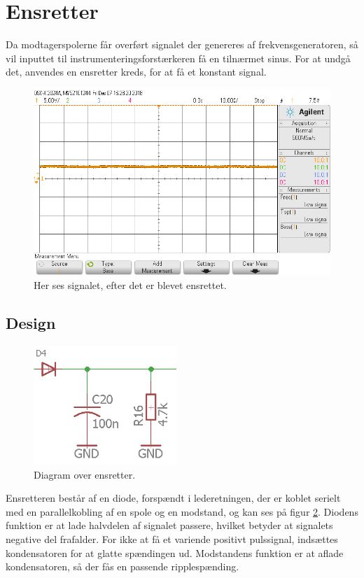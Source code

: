 \section{Ensretter}\label{sec:ensretter}
Da modtagerspolerne får overført signalet der genereres af frekvensgeneratoren, så vil inputtet til instrumenteringsforstærkeren få en tilnærmet sinus.
For at undgå det, anvendes en ensretter kreds, for at få et konstant signal.
\begin{figure}[h!]
	\centering
	\includegraphics[width=1\textwidth]{billeder/ensretter_png.png}
	\caption{Her ses signalet, efter det er blevet ensrettet.}
	\label{fig:filter_out}
\end{figure}
\subsection{Design}
\begin{figure}
	\centering
	\includegraphics[width=0.48\textwidth]{billeder/rectifier.png}
	\caption{Diagram over ensretter.}
	\label{fig:rectifier}
\end{figure}
Ensretteren består af en diode, forspændt i lederetningen, der er koblet serielt med en parallelkobling af en spole og en modstand, og kan ses på figur \ref{fig:rectifier}.
Diodens funktion er at lade halvdelen af signalet passere, hvilket betyder at signalets negative del frafalder. 
For ikke at få et variende positivt pulssignal, indsættes kondensatoren for at glatte spændingen ud. Modstandens funktion er at aflade kondensatoren, så der fås en passende ripplespænding.

